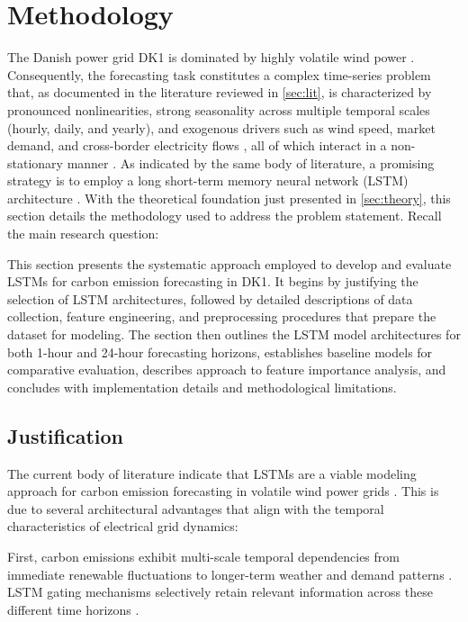 \thispagestyle{plain}
\section{Methodology}

The Danish power grid DK1 is dominated by highly volatile wind power \parencite{iea2023,wang2017}. Consequently, the forecasting task constitutes a complex time-series problem that, as documented in the literature reviewed in \autoref{sec:lit}, is characterized by pronounced nonlinearities, strong seasonality across multiple temporal scales (hourly, daily, and yearly), and exogenous drivers such as wind speed, market demand, and cross-border electricity flows \parencite{entsoe2022}, all of which interact in a non-stationary manner \parencite{hyndman2021,box2015,carlini2023}. As indicated by the same body of literature, a promising strategy is to employ a long short-term memory neural network (LSTM) architecture \parencite{leerbeck2020,bokde2021,kohut2025,ostermann2024,lowry2018}. With the theoretical foundation just presented in \autoref{sec:theory}, this section details the methodology used to address the problem statement. Recall the main research question:

\researchquestion{}

This section presents the systematic approach employed to develop and evaluate LSTMs for carbon emission forecasting in DK1. It begins by justifying the selection of LSTM architectures, followed by detailed descriptions of data collection, feature engineering, and preprocessing procedures that prepare the dataset for modeling. The section then outlines the LSTM model architectures for both 1-hour and 24-hour forecasting horizons, establishes baseline models for comparative evaluation, describes approach to feature importance analysis, and concludes with implementation details and methodological limitations.

\subsection{Justification}

The current body of literature indicate that LSTMs are a viable modeling approach for carbon emission forecasting in volatile wind power grids \parencite{leerbeck2020,bokde2021,kohut2025,ostermann2024}. This is due to several architectural advantages that align with the temporal characteristics of electrical grid dynamics:

First, carbon emissions exhibit multi-scale temporal dependencies from immediate renewable fluctuations to longer-term weather and demand patterns \parencite{bokde2021}. LSTM gating mechanisms selectively retain relevant information across these different time horizons \parencite{goodfellow2016,hochreiter1997}.


